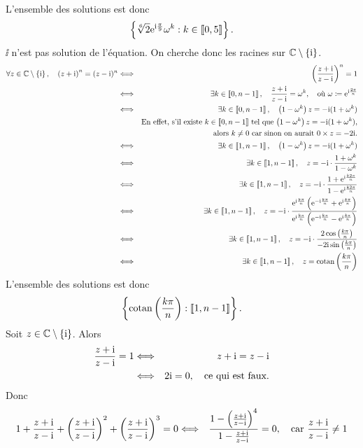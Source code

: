 \documentclass{magnolia}
\begin{document}
\begin{sol}
\begin{questions}
\begin{eqnarray*}
  \end{eqnarray*}
  L'ensemble des solutions est donc
\[\left\{\sqrt[6]{2}{\rm e}^{{\rm i}\frac{\pi}{9}}\omega^k : k\in\left\llbracket 0,5\right\rrbracket\right\}.\]
\question $\ii$ n'est pas solution de l'équation. On cherche donc les racines sur $\mathbb{C}\setminus\left\{{\rm i}\right\}$.
\begin{eqnarray*}
\forall z\in\mathbb{C}\setminus\left\{{\rm i}\right\},\quad \left(z+{\rm i}\right)^n=(z-{\rm i})^{n}
&\Longleftrightarrow& \left(\frac{z+{\rm i}}{z-{\rm i}}\right)^n=1\\
&\Longleftrightarrow& \exists k\in\left\llbracket 0,n-1\right\rrbracket,\quad \frac{z+{\rm i}}{z-{\rm i}}=\omega^k, \quad\text{où $\omega\coloneqq{\rm e}^{{\rm i}\frac{2\pi}{n}}$}\\
&\Longleftrightarrow& \exists k\in\left\llbracket 0,n-1\right\rrbracket,\quad \left(1-\omega^k\right)z=-{\rm i}(1+\omega^k)\\
&    & \text{En effet, s'il existe $k\in\left\llbracket 0,n-1\right\rrbracket$ tel que $\left(1-\omega^k\right)z=-{\rm i}(1+\omega^k)$,}\\
&    & \text{alors $k\neq 0$ car sinon on aurait $0\times z=-2{\rm i}$.}\\
&\Longleftrightarrow& \exists k\in\left\llbracket 1,n-1\right\rrbracket,\quad \left(1-\omega^k\right)z=-{\rm i}(1+\omega^k)\\
&\Longleftrightarrow& \exists k\in\left\llbracket 1,n-1\right\rrbracket,\quad z=-{\rm i}\cdot\frac{1+\omega^k}{1-\omega^k}\\
&\Longleftrightarrow& \exists k\in\left\llbracket 1,n-1\right\rrbracket,\quad z=-{\rm i}\cdot\frac{1+{\rm e}^{{\rm i}\frac{k2\pi}{n}}}{1-{\rm e}^{{\rm i}\frac{k2\pi}{n}}}\\
&\Longleftrightarrow& \exists k\in\left\llbracket 1,n-1\right\rrbracket,\quad z=-{\rm i}\cdot\frac{{\rm e}^{{\rm i}\frac{k\pi}{n}}\left({\rm e}^{-{\rm i}\frac{k\pi}{n}}+{\rm e}^{{\rm i}\frac{k\pi}{n}}\right)}{{\rm e}^{{\rm i}\frac{k\pi}{n}}\left({\rm e}^{-{\rm i}\frac{k\pi}{n}}-{\rm e}^{{\rm i}\frac{k\pi}{n}}\right)}\\
&\Longleftrightarrow& \exists k\in\left\llbracket 1,n-1\right\rrbracket,\quad z=-{\rm i}\cdot\frac{2\cos\left(\frac{k\pi}{n}\right)}{-2{\rm i}\sin\left(\frac{k\pi}{n}\right)}\\
&\Longleftrightarrow& \exists k\in\left\llbracket 1,n-1\right\rrbracket,\quad z=\operatorname{cotan}\left(\frac{k\pi}{n}\right)
\end{eqnarray*}
L'ensemble des solutions est donc
\[\left\{\operatorname{cotan}\left(\frac{k\pi}{n}\right) : \left\llbracket 1,n-1\right\rrbracket\right\}.\]
\question Soit $z\in\mathbb{C}\setminus\left\{{\rm i}\right\}$. Alors
  \begin{eqnarray*}
  \frac{z+{\rm i}}{z-{\rm i}}=1
  &\Longleftrightarrow& z+{\rm i}=z-{\rm i}\\
  &\Longleftrightarrow& 2{\rm i}=0, \quad\text{ce qui est faux.}
  \end{eqnarray*}
  Donc
  \begin{eqnarray*}
  1+\frac{z+\ii}{z-\ii}+\p{\frac{z+\ii}{z-\ii}}^2+\p{\frac{z+\ii}{z-\ii}}^3=0
  &\ssi& \frac{1-\p{\frac{z+\ii}{z-\ii}}^4}{1-\frac{z+\ii}{z-\ii}}=0, \quad\text{car $\dfrac{z+\ii}{z-\ii}\neq 1$}\\

\end{eqnarray*}
\end{questions}
\end{sol}
\end{document}
